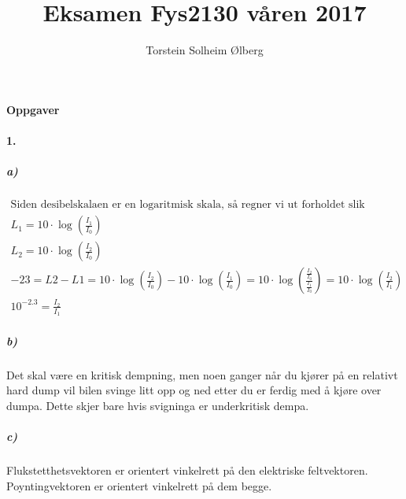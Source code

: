 \documentclass[11pt, A4paper,norsk]{article}
\author{Torstein Solheim Ølberg}
\title{Eksamen Fys2130 våren 2017}
\begin{document}
\maketitle
	\begin{center}
\Large \textbf{Oppgaver}
	\end{center}









		\paragraph{1.}
			\subparagraph{a)}
				\begin{gather*}
\text{Siden desibelskalaen er en logaritmisk skala, så regner vi ut forholdet slik} \\
L_1 = 10 \cdot \log\left( \frac{I_1}{I_0} \right) \\
L_2 = 10 \cdot \log\left( \frac{I_2}{I_0} \right) \\
- 23 = L2 - L1 = 10 \cdot \log\left( \frac{I_2}{I_0} \right) - 10 \cdot \log\left( \frac{I_1}{I_0} \right) = 10 \cdot \log\left( \frac{\frac{I_2}{I_0}}{\frac{I_1}{I_0}} \right) = 10 \cdot \log\left( \frac{I_2}{I_1} \right) \\
10^{- 2.3} = \frac{I_2}{I_1}
				\end{gather*}









			\subparagraph{b)}
				\begin{flushleft}
Det skal være en kritisk dempning, men noen ganger når du kjører på en relativt hard dump vil bilen svinge litt opp og ned etter du er ferdig med å kjøre over dumpa. Dette skjer bare hvis svigninga er underkritisk dempa.
				\end{flushleft}

			









			\subparagraph{c)}
				\begin{flushleft}
Flukstetthetsvektoren er orientert vinkelrett på den elektriske feltvektoren. Poyntingvektoren er orientert vinkelrett på dem begge.
				\end{flushleft}
\end{document}
